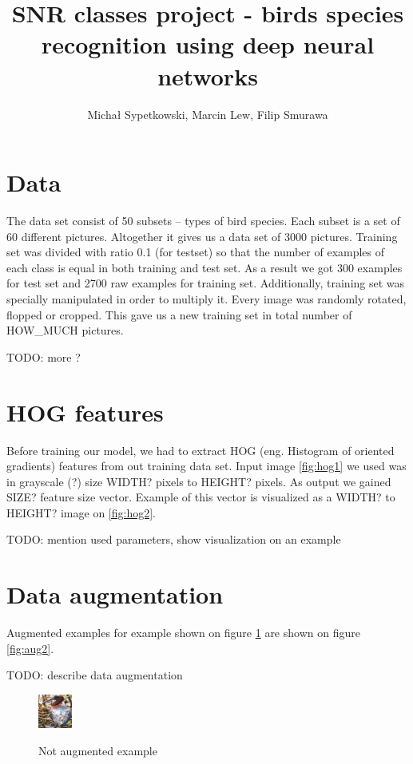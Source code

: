 \documentclass[a4paper]{article}
\begin{document}
\title{SNR classes project - birds species recognition using deep neural networks}

\author{Michał Sypetkowski, Marcin Lew, Filip Smurawa}
\maketitle

\section{Data}
The data set consist of 50 subsets – types of bird species. Each subset is a set of 60 different pictures. Altogether it gives us a data set of 3000 pictures.
Training set was divided with ratio 0.1 (for testset) so that the number of examples of each class is equal in both training and test set.
As a result we got 300 examples for test set and 2700 raw examples for training set.
Additionally, training set was specially manipulated in order to multiply it. Every image was randomly rotated, flopped or cropped. 
This gave us a new training set in total number of HOW\_MUCH pictures.

TODO: more ?

\section{HOG features}
Before training our model, we had to extract HOG (eng. Histogram of oriented gradients) features from out training data set. 
Input image \ref{fig:hog1} we used was in grayscale (?) size WIDTH? pixels to HEIGHT? pixels. As output we gained SIZE? feature size vector. 
Example of this vector is visualized as a WIDTH? to HEIGHT? image on \ref{fig:hog2}.


TODO: mention used parameters, show visualization on an example


\section{Data augmentation}
Augmented examples for example shown on figure \ref{fig:aug1}
are shown on figure \ref{fig:aug2}.

TODO: describe data augmentation

\begin{figure}[h]
    \caption[]{Not augmented example}
    \centering
    \includegraphics[page=2,width=0.1\textwidth]{aug1.png}
    \label{fig:aug1}
\end{figure}
\end{document}
